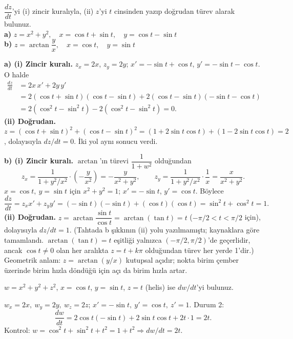 \begin{soru}
$\dfrac{dz}{dt}$'yi (i) zincir kuralıyla, (ii) $z$'yi $t$ cinsinden yazıp doğrudan türev alarak bulunuz.\\
\textbf{a)} $z=x^2+y^2,\quad x=\cos t+\sin t,\quad y=\cos t-\sin t$\\
\textbf{b)} $z=\arctan\dfrac{y}{x},\quad x=\cos t,\quad y=\sin t$
\end{soru}
\begin{cevap}
\textbf{a) (i) Zincir kuralı.} $z_x=2x$, $z_y=2y$; $x'=-\sin t+\cos t$, $y'=-\sin t-\cos t$. O halde
\begin{align*}
\frac{dz}{dt}&=2x\,x'+2y\,y'\\
&=2(\cos t+\sin t)(\cos t-\sin t)+2(\cos t-\sin t)(-\sin t-\cos t)\\
&=2(\cos^2t-\sin^2t)-2(\cos^2t-\sin^2t)=\boxed{0}.
\end{align*}
\textbf{(ii) Doğrudan.} $z=(\cos t+\sin t)^2+(\cos t-\sin t)^2=(1+2\sin t\cos t)+(1-2\sin t\cos t)=2$, dolayısıyla
$dz/dt=0$. İki yol aynı sonucu verdi.

\textbf{b) (i) Zincir kuralı.} $\arctan$'ın türevi $\dfrac{1}{1+w^2}$ olduğundan
\[
z_x=\frac{1}{1+y^2/x^2}\cdot\left(-\frac{y}{x^2}\right)=-\frac{y}{x^2+y^2},\qquad
z_y=\frac{1}{1+y^2/x^2}\cdot\frac{1}{x}=\frac{x}{x^2+y^2}.
\]
$x=\cos t,\ y=\sin t$ için $x^2+y^2=1$; $x'=-\sin t$, $y'=\cos t$. Böylece
\[
\frac{dz}{dt}=z_x x'+z_y y'=(-\sin t)(-\sin t)+(\cos t)(\cos t)=\sin^2t+\cos^2t=\boxed{1}.
\]
\textbf{(ii) Doğrudan.} $z=\arctan\dfrac{\sin t}{\cos t}=\arctan(\tan t)=t$ ($-\pi/2<t<\pi/2$ için), dolayısıyla
$dz/dt=1$. (Tahtada b şıkkının (ii) yolu yazılmamıştı; kaynaklara göre tamamlandı. $\arctan(\tan t)=t$ eşitliği
yalnızca $(-\pi/2,\pi/2)$'de geçerlidir, ancak $\cos t\ne0$ olan her aralıkta $z=t+k\pi$ olduğundan türev her yerde 1'dir.)
Geometrik anlam: $z=\arctan(y/x)$ kutupsal açıdır; nokta birim çember üzerinde birim hızla döndüğü için açı da birim
hızla artar.
\end{cevap}

\begin{soru}
$w=x^2+y^2+z^2$, $x=\cos t$, $y=\sin t$, $z=t$ (helis) ise $dw/dt$'yi bulunuz.
\end{soru}
\begin{cevap}
$w_x=2x,\ w_y=2y,\ w_z=2z$; $x'=-\sin t,\ y'=\cos t,\ z'=1$. Durum 2:
\[
\frac{dw}{dt}=2\cos t(-\sin t)+2\sin t\cos t+2t\cdot1=2t .
\]
Kontrol: $w=\cos^2t+\sin^2t+t^2=1+t^2\Rightarrow dw/dt=2t$. \checkmark
\end{cevap}

